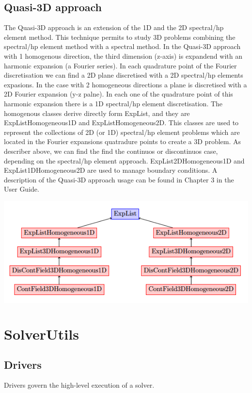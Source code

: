 \subsection{Quasi-3D approach}

The Quasi-3D approach is an extension of the 1D and the 2D spectral/hp element
method. This technique permits to study 3D problems combining the spectral/hp
element method with a spectral method. In the Quasi-3D approach with 1
homogenous direction, the third dimension (z-axis) is expandend with an harmonic
expansion (a Fourier series). In each quadrature point of the Fourier
discretisation we can find a 2D plane discretised with a 2D spectral/hp elements
expasions. In the case with 2 homogeneous directions a plane is discretised with
a 2D Fourier expansion (y-z palne). In each one of the quadrature point of this
harmonic expansion there is a 1D spectral/hp element discretisation. The
homogenous classes derive directly form ExpList, and they are
ExpListHomogeneous1D and ExpListHomogeneous2D. This classes are used to
represent the collections of 2D (or 1D) spectral/hp element problems which are
located in the Fourier expansions quatradure points to create a 3D problem. As
describer above, we can find the find the continuos or discontinuos case,
depending on the spectral/hp element approach. ExpList2DHomogeneous1D and
ExpList1DHomogeneous2D are used to manage boundary conditions. A description of
the Quasi-3D approach usage can be found in Chapter 3 in the User Guide.

\begin{center}
\includegraphics[width=\textwidth]{img/Quasi3d.png}
\end{center}


\section{SolverUtils}

\subsection{Drivers}
Drivers govern the high-level execution of a solver.

